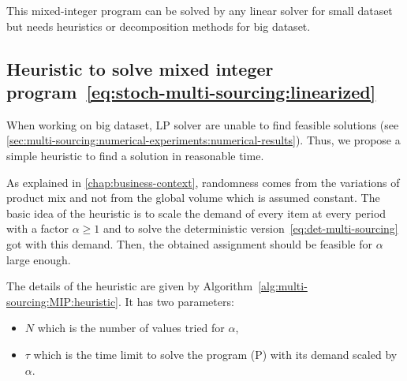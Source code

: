 This mixed-integer program can be solved by any linear solver for small dataset but needs heuristics or decomposition methods for big dataset.


\subsection{Heuristic to solve mixed integer program~\eqref{eq:stoch-multi-sourcing:linearized}}
\label{sec:multi-sourcing:stochastic:solving-method:heuristic}


When working on big dataset, LP solver are unable to find feasible solutions (see \cref{sec:multi-sourcing:numerical-experiments:numerical-results}).
Thus, we propose a simple heuristic to find a solution in reasonable time.


As explained in \cref{chap:business-context}, randomness comes from the variations of product mix and not from the global volume which is assumed constant.
The basic idea of the heuristic is to scale the demand of every item at every period with a factor $\alpha\ge1$ and to solve the deterministic version~\eqref{eq:det-multi-sourcing} got with this demand.
Then, the obtained assignment should be feasible for $\alpha$ large enough.


The details of the heuristic are given by Algorithm~\ref{alg:multi-sourcing:MIP:heuristic}.
It has two parameters:
\begin{itemize}
  \item $N$ which is the number of values tried for $\alpha$,
  \item $\tau$ which is the time limit to solve the program (P) with its demand scaled by $\alpha$.
\end{itemize}


